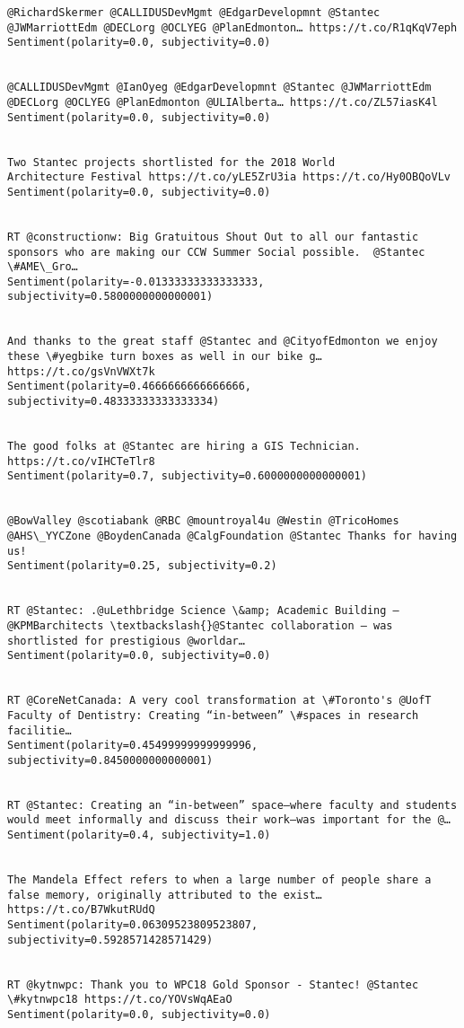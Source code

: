 \documentclass[11pt]{article}
\begin{document}
\begin{Verbatim}[commandchars=\\\{\}]
@RichardSkermer @CALLIDUSDevMgmt @EdgarDevelopmnt @Stantec @JWMarriottEdm @DECLorg @OCLYEG @PlanEdmonton… https://t.co/R1qKqV7eph
Sentiment(polarity=0.0, subjectivity=0.0)


@CALLIDUSDevMgmt @IanOyeg @EdgarDevelopmnt @Stantec @JWMarriottEdm @DECLorg @OCLYEG @PlanEdmonton @ULIAlberta… https://t.co/ZL57iasK4l
Sentiment(polarity=0.0, subjectivity=0.0)


Two Stantec projects shortlisted for the 2018 World Architecture Festival https://t.co/yLE5ZrU3ia https://t.co/Hy0OBQoVLv
Sentiment(polarity=0.0, subjectivity=0.0)


RT @constructionw: Big Gratuitous Shout Out to all our fantastic sponsors who are making our CCW Summer Social possible.  @Stantec \#AME\_Gro…
Sentiment(polarity=-0.01333333333333333, subjectivity=0.5800000000000001)


And thanks to the great staff @Stantec and @CityofEdmonton we enjoy these \#yegbike turn boxes as well in our bike g… https://t.co/gsVnVWXt7k
Sentiment(polarity=0.4666666666666666, subjectivity=0.48333333333333334)


The good folks at @Stantec are hiring a GIS Technician. https://t.co/vIHCTeTlr8
Sentiment(polarity=0.7, subjectivity=0.6000000000000001)


@BowValley @scotiabank @RBC @mountroyal4u @Westin @TricoHomes @AHS\_YYCZone @BoydenCanada @CalgFoundation @Stantec Thanks for having us!
Sentiment(polarity=0.25, subjectivity=0.2)


RT @Stantec: .@uLethbridge Science \&amp; Academic Building – @KPMBarchitects \textbackslash{}@Stantec collaboration – was shortlisted for prestigious @worldar…
Sentiment(polarity=0.0, subjectivity=0.0)


RT @CoreNetCanada: A very cool transformation at \#Toronto's @UofT Faculty of Dentistry: Creating “in-between” \#spaces in research facilitie…
Sentiment(polarity=0.45499999999999996, subjectivity=0.8450000000000001)


RT @Stantec: Creating an “in-between” space—where faculty and students would meet informally and discuss their work—was important for the @…
Sentiment(polarity=0.4, subjectivity=1.0)


The Mandela Effect refers to when a large number of people share a false memory, originally attributed to the exist… https://t.co/B7WkutRUdQ
Sentiment(polarity=0.06309523809523807, subjectivity=0.5928571428571429)


RT @kytnwpc: Thank you to WPC18 Gold Sponsor - Stantec! @Stantec \#kytnwpc18 https://t.co/YOVsWqAEaO
Sentiment(polarity=0.0, subjectivity=0.0)



\end{Verbatim}
\end{document}
